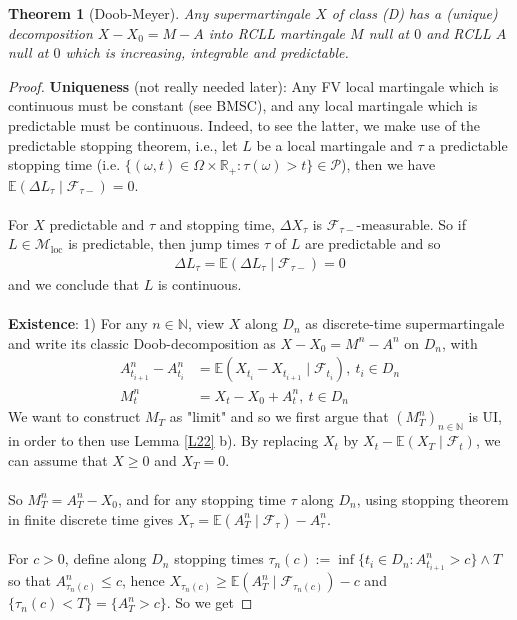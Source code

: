 \documentclass[12pt,a4paper, twoside]{article}
\newtheorem{thm}{Theorem}[section]
\theoremstyle{definition}
\newcommand{\EE}{\mathbb{E}} %
\begin{document}
\begin{thm}[Doob-Meyer] \label{T24} Any supermartingale $X$ of class (D) has a (unique) decomposition $X-X_0=M-A$ into RCLL martingale $M$ null at $0$ and RCLL $A$ null at $0$ which is increasing, integrable and predictable.
\end{thm}
\begin{proof} \textbf{Uniqueness} (not really needed later): Any FV local martingale which is continuous must be constant (see BMSC), and any local martingale which is predictable must be continuous. Indeed, to see the latter, we make use of the predictable stopping theorem, i.e., let $L$ be a local martingale and $\tau$ a predictable stopping time (i.e. $\{( \omega, t) \in \Omega \times \mathbb{R}_+ : \tau( \omega) >t \} \in \mathcal{P}$), then we have $\EE( \Delta L_\tau \mid \mathcal{F}_{\tau-})=0$. \\
\\
For $X$ predictable and $\tau$ and stopping time, $\Delta X_\tau$ is $\mathcal{F}_{\tau-}$-measurable. So if $L \in \mathcal{M}_\text{loc}$ is predictable, then jump times $\tau$ of $L$ are predictable and so 
\begin{align*}
\Delta L_\tau = \EE( \Delta L_\tau \mid \mathcal{F}_{\tau-})=0
\end{align*}
and we conclude that $L$ is continuous. 
\\
\\
\textbf{Existence}: 1) For any $n \in \mathbb{N}$, view $X$ along $D_n$ as discrete-time supermartingale and write its classic Doob-decomposition as $X-X_0=M^n-A^n$ on $D_n$, with 
\begin{align*}
A_{t_{i+1}}^n -A_{t_i}^n &= \EE( X_{t_i}-X_{t_{i+1}} \mid \mathcal{F}_{t_i}), \ t_i \in D_n \\
M_t^n &= X_t-X_0 + A_t^n, \ t  \in D_n
\end{align*}
We want to construct $M_T$ as "limit" and so we first argue that $(M_T^n)_{n \in \mathbb{N}}$ is UI, in order to then use Lemma \ref{L22} b). By replacing $X_t$ by $X_t- \EE(X_T \mid \mathcal{F}_t)$, we can assume that $X \geq 0$ and $X_T=0$. \\
\\
So $M_T^n = A_T^n -X_0$, and for any stopping time $\tau$ along $D_n$, using stopping theorem in finite discrete time gives $X_\tau = \EE(A_T^n \mid \mathcal{F}_\tau) - A_\tau^n$. 
\\\\
For $c>0$, define along $D_n$ stopping times $\tau_n(c):= \inf \{ t_i \in D_n : A_{t_{i+1}}^n > c \} \wedge T$ so that $A_{\tau_n(c)}^n \leq c$, hence $X_{\tau_n(c)} \geq \EE(A_T^n \mid \mathcal{F}_{\tau_n(c)}) -c$ and $\{ \tau_n(c) < T\} = \{ A_T^n > c\}$. So we get 

\end{proof}
\end{document}
